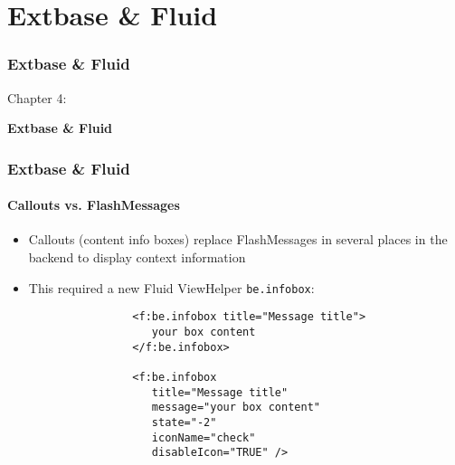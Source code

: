 %

\section{Extbase \& Fluid}
\begin{frame}[fragile]
	\frametitle{Extbase \& Fluid}

	\begin{center}\huge{Chapter 4:}\end{center}
	\begin{center}\huge{\color{typo3darkgrey}\textbf{Extbase \& Fluid}}\end{center}

\end{frame}


\begin{frame}[fragile]
	\frametitle{Extbase \& Fluid}
	\framesubtitle{Callouts vs. FlashMessages}

	\begin{itemize}

		\item Callouts (content info boxes) replace FlashMessages in several places
			in the backend to display context information

		\item This required a new Fluid ViewHelper \texttt{be.infobox}:

			\begin{lstlisting}
				<f:be.infobox title="Message title">
				   your box content
				</f:be.infobox>

				<f:be.infobox
				   title="Message title"
				   message="your box content"
				   state="-2"
				   iconName="check"
				   disableIcon="TRUE" />
			\end{lstlisting}

	\end{itemize}

\end{frame}

